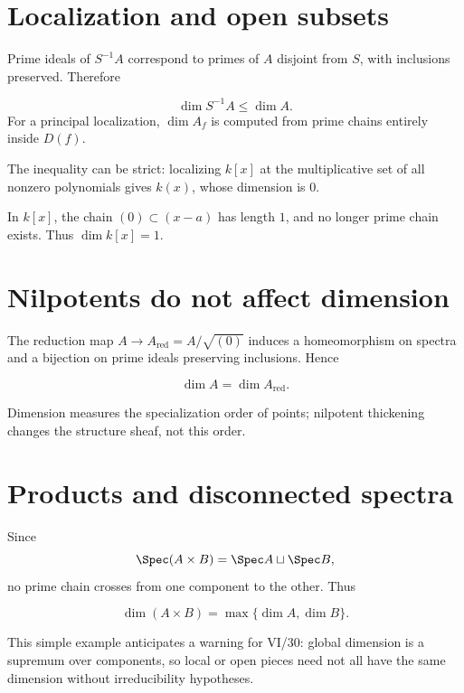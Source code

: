 

\section{Localization and open subsets}
Prime ideals of $S^{-1}A$ correspond to primes of $A$ disjoint from $S$, with inclusions preserved.  Therefore
\begin{proposition}\label{prop:vi29-localization-dimension}
\[
\dim S^{-1}A\leq\dim A.
\]
For a principal localization, $\dim A_f$ is computed from prime chains entirely inside $D(f)$.
\end{proposition}
The inequality can be strict: localizing $k[x]$ at the multiplicative set of all nonzero polynomials gives $k(x)$,
whose dimension is $0$.



\begin{example}\label{ex:vi29-expand-02}
In $k[x]$, the chain $(0)\subset(x-a)$ has length $1$, and no longer prime chain exists.  Thus $\dim k[x]=1$.
\end{example}
\section{Nilpotents do not affect dimension}
The reduction map $A\to A_{\mathrm{red}}=A/\sqrt{(0)}$ induces a homeomorphism on spectra and a bijection on prime
ideals preserving inclusions.  Hence
\begin{proposition}\label{prop:vi29-reduction-dimension}
\[
\dim A=\dim A_{\mathrm{red}}.
\]
\end{proposition}
Dimension measures the specialization order of points; nilpotent thickening changes the structure sheaf, not this
order.



\section{Products and disconnected spectra}
Since
\[
\Spec(A\times B)=\Spec A\sqcup\Spec B,
\]
no prime chain crosses from one component to the other.  Thus
\begin{proposition}\label{prop:vi29-product-dimension}
\[
\dim(A\times B)=\max\{\dim A,\dim B\}.
\]
\end{proposition}
This simple example anticipates a warning for VI/30: global dimension is a supremum over components, so local or open
pieces need not all have the same dimension without irreducibility hypotheses.

